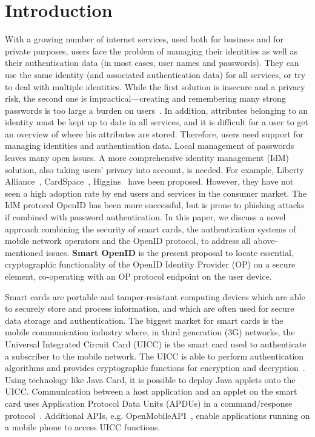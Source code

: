 \documentclass[runningheads,a4paper]{llncs}
\begin{document}

\section{Introduction}
\label{sec:introduction}
With a growing number of internet services, used both for business and for private purposes, users face the problem of managing their identities as well as their authentication data (in most cases, user names and passwords). They can use the same identity (and associated authentication data) for all services, or try to deal with multiple identities. While the first solution is insecure and a privacy risk, the second one is impractical---creating and remembering many strong passwords is too large a burden on users~\cite{ACP:ACP1014,smith2002strong}. In addition, attributes belonging to an identity must be kept up to date in all services, and it is difficult for a user to get an overview of where his attributes are stored. Therefore, users need support for managing identities and authentication data. Local management of passwords leaves many open issues. A more comprehensive identity management (IdM) solution, also taking users' privacy into account, is needed. For example, Liberty Alliance~\cite{alliance2002liberty}, CardSpace~\cite{chappell2006introducing,bertocci2007understanding}, Higgins~\cite{Higgins} have been proposed.
However, they have not seen a high adoption rate by end users and services in the consumer market. The IdM protocol OpenID has been more successful, but is prone to phishing attacks if combined with password authentication. In this paper, we discuss a novel approach combining the security of smart cards, the authentication systems of mobile network operators and the OpenID protocol, to address all above-mentioned issues. \textbf{Smart OpenID} is the present proposal to locate essential, cryptographic functionality of the OpenID Identity Provider (OP) on a secure element, co-operating with an OP protocol endpoint on the user device.

Smart cards are portable and tamper-resistant computing devices which are able to securely store and process information, and which are often used for secure data storage and authentication.
The biggest market for smart cards is the mobile communication industry where, in third generation (3G) networks, the Universal Integrated Circuit Card (UICC) is the
smart card used to authenticate a subscriber to the mobile network.
The UICC is able to perform authentication algorithms and provides cryptographic functions for encryption and decryption~\cite{chen2000java}.
Using technology like Java Card, it is possible to deploy Java applets onto the UICC.
Communication between a host application and an applet on the smart card uses Application Protocol Data Units (APDUs) in a command/response  protocol~\cite{iso7816-4}.
Additional APIs, e.g. OpenMobileAPI~\cite{OpenMobileAPI2}, enable applications running on a mobile phone to access UICC functions.
\end{document}
